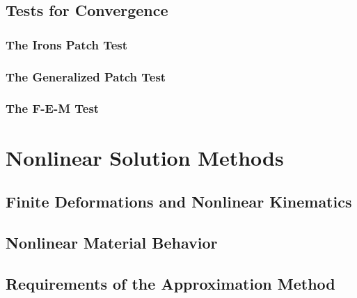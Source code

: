 \subsection{Tests for Convergence}
\subsubsection{The Irons Patch Test}
\subsubsection{The Generalized Patch Test}
\subsubsection{The F-E-M Test}

\section{Nonlinear Solution Methods}
\subsection{Finite Deformations and Nonlinear Kinematics}
\subsection{Nonlinear Material Behavior}
\subsection{Requirements of the Approximation Method}
